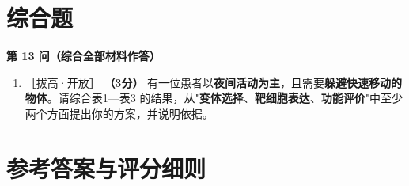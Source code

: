 \documentclass[UTF8,a4paper,11pt]{ctexart}
\newcommand{\pt}[1]{\textbf{（#1分）}}
\newcommand{\lv}[1]{{\small\color{deepgreen}［#1］}}
\begin{document}
\section{综合题}

\begin{qbox}
\noindent\textbf{\color{deepgreen}第 13 问（综合全部材料作答）}
\begin{enumerate}[leftmargin=2.2em,itemsep=5pt,start=13]
\item \lv{拔高·开放} \pt{3} 有一位患者以\textbf{夜间活动为主}，且需要\textbf{躲避快速移动的物体}。请综合表1—表3 的结果，从"\textbf{变体选择}、\textbf{靶细胞表达}、\textbf{功能评价}"中至少两个方面提出你的方案，并说明依据。
\end{enumerate}
\end{qbox}

\clearpage
\section*{参考答案与评分细则}
\end{document}
